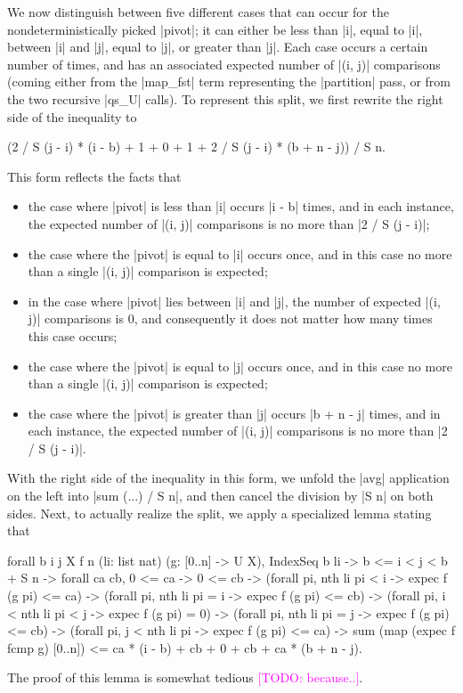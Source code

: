 \documentclass[runningheads]{llncs}
\newcommand{\todo}[1]{\textcolor{magenta}{[TODO: #1]}}
\begin{document}
We now distinguish between five different cases that can occur for the nondeterministically picked |pivot|; it can either be less than |i|, equal to |i|, between |i| and |j|, equal to |j|, or greater than |j|. Each case occurs a certain number of times, and has an associated expected number of |(i, j)| comparisons (coming either from the |map_fst| term representing the |partition| pass, or from the two recursive |qs_U| calls). To represent this split, we first rewrite the right side of the inequality to\begin{code}(2 / S (j - i) * (i - b) + 1 + 0 + 1 + 2 / S (j - i) * (b + n - j)) / S n.\end{code}
This form reflects the facts that
\begin{itemize}
\item the case where |pivot| is less than |i| occurs |i - b| times, and in each instance, the expected number of |(i, j)| comparisons is no more than |2 / S (j - i)|;
\item the case where the |pivot| is equal to |i| occurs once, and in this case no more than a single |(i, j)| comparison is expected;
\item in the case where |pivot| lies between |i| and |j|, the number of expected |(i, j)| comparisons is 0, and consequently it does not matter how many times this case occurs;
\item the case where the |pivot| is equal to |j| occurs once, and in this case no more than a single |(i, j)| comparison is expected;
\item the case where the |pivot| is greater than |j| occurs |b + n - j| times, and in each instance, the expected number of |(i, j)| comparisons is no more than |2 / S (j - i)|.
\end{itemize}
With the right side of the inequality in this form, we unfold the |avg| application on the left into |sum (...) / S n|, and then cancel the division by |S n| on both sides. Next, to actually realize the split, we apply a specialized lemma stating that
\begin{code}
   forall b i j X f n (li: list nat)
     (g: [0..n] -> U X), IndexSeq b li ->
    b <= i < j < b + S n -> forall ca cb, 0 <= ca -> 0 <= cb ->
    (forall pi, nth li pi < i -> expec f (g pi) <= ca) ->
    (forall pi, nth li pi = i -> expec f (g pi) <= cb) ->
    (forall pi, i < nth li pi < j -> expec f (g pi) = 0) ->
    (forall pi, nth li pi = j -> expec f (g pi) <= cb) ->
    (forall pi, j < nth li pi -> expec f (g pi) <= ca) ->
      sum (map (expec f fcmp g) [0..n]) <=
        ca * (i - b) + cb + 0 + cb + ca * (b + n - j).
\end{code}
The proof of this lemma is somewhat tedious \todo{because..}.
\end{document}
